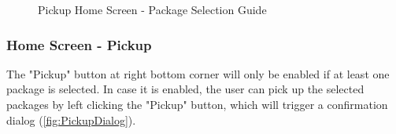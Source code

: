 \begin{figure}[H]
	\hspace{5pt}
	\caption{Pickup Home Screen - Package Selection Guide}
	\label{fig:PickupHomeScreen-2}
\end{figure}


\subsubsection{Home Screen - Pickup}
The "Pickup" button at right bottom corner will only be enabled if at least one package is selected. In case it is enabled, the user can pick up the selected packages by left clicking the "Pickup" button, which will trigger a confirmation dialog (\autoref{fig:PickupDialog}). 

